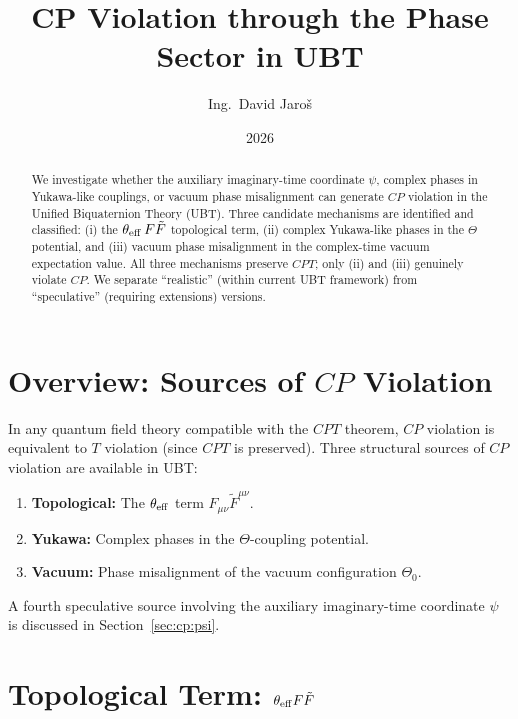 \documentclass[12pt,a4paper]{article}
\title{\textbf{CP Violation through the Phase Sector in UBT}}
\author{Ing.\ David Jaro\v{s}}
\date{2026}
\theoremstyle{definition}
\theoremstyle{remark}
\begin{document}
  \maketitle

  \begin{abstract}
  We investigate whether the auxiliary imaginary-time coordinate $\psi$,
  complex phases in Yukawa-like couplings, or vacuum phase misalignment
  can generate $CP$ violation in the Unified Biquaternion Theory (UBT).
  Three candidate mechanisms are identified and classified: (i) the
  $\theta_{\rm eff}\,F\tilde F$ topological term, (ii) complex Yukawa-like
  phases in the $\Theta$ potential, and (iii) vacuum phase misalignment in the
  complex-time vacuum expectation value.
  All three mechanisms preserve $CPT$; only (ii) and (iii) genuinely violate
  $CP$.  We separate ``realistic'' (within current UBT framework) from
  ``speculative'' (requiring extensions) versions.
  \end{abstract}
\fi

\section{Overview: Sources of $CP$ Violation}
\label{sec:cp:overview}

In any quantum field theory compatible with the $CPT$ theorem,
$CP$ violation is equivalent to $T$ violation (since $CPT$ is preserved).
Three structural sources of $CP$ violation are available in UBT:
\begin{enumerate}
  \item \textbf{Topological:} The $\theta_{\rm eff}$ term $F_{\mu\nu}\tilde F^{\mu\nu}$.
  \item \textbf{Yukawa:} Complex phases in the $\Theta$-coupling potential.
  \item \textbf{Vacuum:} Phase misalignment of the vacuum configuration $\Theta_0$.
\end{enumerate}
A fourth speculative source involving the auxiliary imaginary-time coordinate
$\psi$ is discussed in Section~\ref{sec:cp:psi}.

\section{Topological Term: $\theta_{\rm eff} F\tilde F$}
\label{sec:cp:theta}
\end{document}
